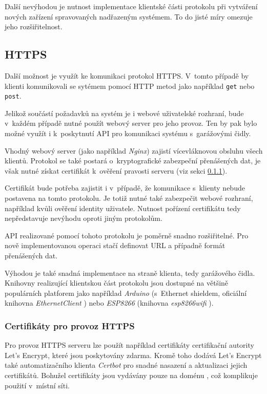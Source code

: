 Další nevýhodou je nutnost implementace klientské části protokolu při vytváření nových zařízení spravovaných nadřazeným systémem. To do jisté míry omezuje jeho rozšiřitelnost.

\subsection{HTTPS}

Další možnost je využít ke komunikaci protokol HTTPS. V~tomto případě by klienti komunikovali se sytémem pomocí HTTP metod jako například \verb|get| nebo \verb|post|.

Jelikož součástí požadavků na systém je i webové uživatelské rozhraní, bude v~každém případě nutné použít webový server pro jeho provoz. Ten by pak bylo možné využít i k~poskytnutí API pro komunikaci systému s~garážovými čidly.

Vhodný webový server (jako například \textit{Nginx}) zajistí vícevláknovou obsluhu všech klientů. Protokol se také postará o~kryptografické zabezpeční přenášených dat, je však nutné získat certifikát k~ověření pravosti serveru (viz sekci \ref{an_certs}).

Certifikát bude potřeba zajistit i v~případě, že komunikace s~klienty nebude postavena na tomto protokolu. Je totiž nutné také zabezpečit webové rozhraní, například kvůli ověření identity uživatele. Nutnost pořízení certifikátu tedy nepředstavuje nevýhodu oproti jiným protokolům. 

API realizované pomocí tohoto protokolu je poměrně snadno rozšiřitelné. Pro nově implementovanou operaci stačí definovat URL a případně formát přenášených dat.

Výhodou je také snadná implementace na straně klienta, tedy garážového čidla. Knihovny realizující klientskou část protokolu jsou dostupné na většině populárních platforem jako například \textit{Arduino} (s~Ethernet shieldem, oficiální knihovna \textit{EthernetClient} \cite{ard_web}) nebo \textit{ESP8266} (knihovna \textit{esp8266wifi} \cite{esp_web}).

\subsubsection{Certifikáty pro provoz HTTPS}
\label{an_certs}

Pro provoz HTTPS serveru lze použít například certifikáty certifikační autority Let's Encrypt, které jsou poskytovány  zdarma. Kromě toho dodává Let's Encrypt také automatizačního klienta \textit{Certbot} \cite{certbot} pro snadné nasazení a aktualizaci jejich certifikátů. Bohužel certifikáty jsou vydávány pouze na doménu \cite{lets_encrypt_faq}, což komplikuje použití v~místní síti.

